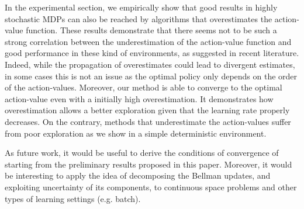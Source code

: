 \documentclass[conference]{IEEEtran}
\begin{document}
In the experimental section, we empirically show that good results in highly stochastic MDPs can also be reached by algorithms that overestimates the action-value function. These results demonstrate that there seems not to be such a strong correlation between the underestimation of the action-value function and good performance in these kind of environments, as suggested in recent literature. Indeed, while the propagation of overestimates could lead to divergent estimates, in some cases this is not an issue as the optimal policy only depends on the order of the action-values. Moreover, our method is able to converge to the optimal action-value even with a initially high overestimation. It demonstrates how overestimation allows a better exploration given that the learning rate properly decreases. On the contrary, methods that underestimate the action-values suffer from poor exploration as we show in a simple deterministic environment.

As future work, it would be useful to derive the conditions of convergence of \alg starting from the preliminary results proposed in this paper. Moreover, it would be interesting to apply the idea of decomposing the Bellman updates, and exploiting uncertainty of its components, to continuous space problems and other types of learning settings (e.g. batch).






\end{document}
